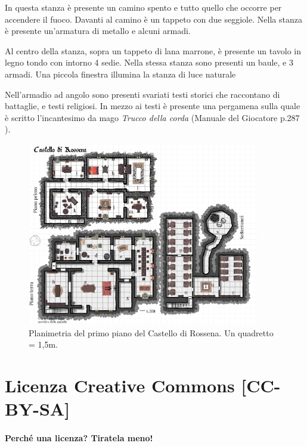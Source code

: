 \documentclass[letterpaper,twocolumn,openany,nodeprecatedcode]{dndbook}
\begin{document}
In questa stanza è presente un camino spento e tutto quello che occorre per accendere il fuoco. Davanti al camino è un tappeto con due seggiole. Nella stanza è presente un'armatura di metallo e alcuni armadi.

\begin{DndReadAloud}
Al centro della stanza, sopra un tappeto di lana marrone, è presente un tavolo in legno tondo con intorno 4 sedie. Nella stessa stanza sono presenti un baule, e 3 armadi. Una piccola finestra illumina la stanza di luce naturale
\end{DndReadAloud}

Nell'armadio ad angolo sono presenti svariati testi storici che raccontano di battaglie, e testi religiosi. In mezzo ai testi è presente una pergamena sulla quale è scritto l'incantesimo da mago \textit{Trucco della corda} (Manuale del Giocatore p.287 \cite{dnd:giocatore}).


\begin{figure}
\centering
\includegraphics[width=0.9\textwidth]{img/rossena.png}
\caption{Planimetria del primo piano del Castello di Rossena. Un quadretto = 1,5m.}
\label{rossena1}
\end{figure}


\chapter*{Licenza Creative Commons [CC-BY-SA]}
\subsubsection{Perché una licenza? Tiratela meno!}
\end{document}
